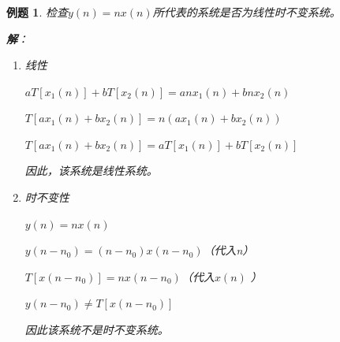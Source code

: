 \documentclass[notheorems,compress,mathserif,table]{beamer}
\newtheorem{example}{例题}
\begin{document}
\begin{frame}\frametitle{}%
\begin{example}
检查$y(n)=nx(n)$所代表的系统是否为线性时不变系统。
\par\textbf{解}：
\begin{enumerate}
  \item 线性  \par
        $aT[x_{1}(n)] + bT[x_{2}(n)]= a n x_{1}(n) + b n x_{2}(n)$\par
        $T[ax_{1}(n)+bx_{2}(n)] = n(a x_{1}(n) + bx_{2}(n))$\par
        $T[ax_{1}(n)+bx_{2}(n)] =  aT[x_{1}(n)] + bT[x_{2}(n)]$\par
        因此，该系统是线性系统。
  \item 时不变性 \par
        $y(n) = nx(n)$\par
        $y(n-n_{0}) = (n-n_{0})x(n-n_{0})$\quad\quad  （代入n）\par
        $T[x(n-n_{0})] = nx(n-n_{0})$\quad\quad\quad\quad （代入$x(n)$ ）\par
        $y(n-n_{0}) \neq T[x(n-n_{0})]$\par
        因此该系统不是时不变系统。
\end{enumerate}
\end{example}
\end{frame}
\end{document}
